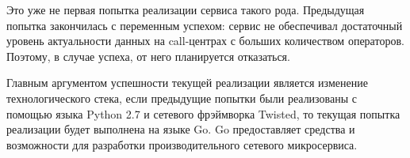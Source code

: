 Это уже не первая попытка реализации сервиса такого рода.
Предыдущая попытка закончилась с переменным успехом: сервис не обеспечивал достаточный уровень актуальности данных
на call-центрах с больших количеством операторов.
Поэтому, в случае успеха, от него планируется отказаться.

Главным аргументом успешности текущей реализации является изменение технологического стека,
если предыдущие попытки были реализованы с помощью языка Python 2.7 и сетевого фрэймворка Twisted, %
то текущая попытка реализации будет выполнена на языке Go.
Go предоставляет средства и возможности для разработки производительного сетевого микросервиса.



